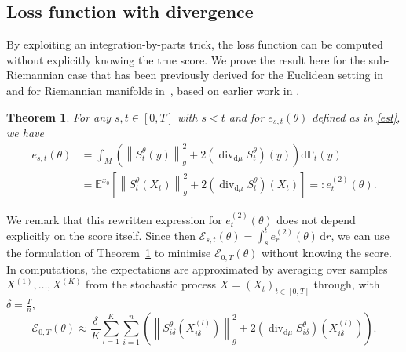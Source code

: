 \documentclass[10pt]{amsart}
\newcounter{dummy} \numberwithin{dummy}{section}
\newtheorem{theorem}[dummy]{Theorem}
\theoremstyle{remark}
\newcommand{\scrE}{\mathscr{E}}
\newcommand{\E}{\mathbb{E}}
\newcommand{\pp}{\mathbb{P}}
\DeclareMathOperator{\dv}{div}
\newcommand{\dd}{\,{\mathrm d}}
\newcommand{\db}{{\mathrm d}}
\numberwithin{equation}{section}
\begin{document}
\subsection{Loss function with divergence}
By exploiting an integration-by-parts trick, the loss function can be computed without explicitly knowing the true score. We prove the result here for the sub-Riemannian case that has been previously derived for the Euclidean setting in~\cite{hyvarinenEstimationNonNormalizedStatistical2005} and for Riemannian manifolds in~\cite{bortoliRiemannianScoreBasedGenerative2022}, based on earlier work in \cite{song2019generative,song2020improved}.

\begin{theorem}\label{thm:IBP}
For any $s,t\in[0,T]$ with $s<t$ and for $e_{s,t}(\theta)$ defined as in \eqref{est}, we have
\begin{equation}
\begin{split}
    e_{s,t}(\theta) & = \int_{M} \left( \left\|S^\theta_{t}(y)\right\|^2_g + 2(\dv_{\db\mu} S_{t}^\theta)(y) \right) \db\pp_{t}(y) \\
    & = \E^{x_0}\left[\left\|S^\theta_{t}(X_t)\right\|^2_g + 2(\dv_{\db\mu} S_{t}^\theta)(X_t)\right]  =: e_t^{(2)}(\theta).
\end{split}
\label{eq:div_loss}
\end{equation}
\end{theorem}
We remark that this rewritten expression for $e_t^{(2)}(\theta)$ does not depend explicitly on the score itself. Since then $\scrE_{s,t}(\theta) = \int_s^t e_r^{(2)}(\theta) \dd r$, we can use the formulation of Theorem~\ref{thm:IBP} to minimise $\scrE_{0,T}(\theta)$ without knowing the score.
In computations, the expectations are approximated by averaging over samples $X^{(1)},\dots,X^{(K)}$ from the stochastic process $X=(X_t)_{t\in [0,T]}$ through, with $\delta = \frac{T}{n}$,
\begin{equation}\label{eq:loss_samples}
\scrE_{0,T}(\theta)
\approx
\frac{\delta}{K}\sum_{l=1}^K \sum_{i=1}^n \left(\left\|S^\theta_{i\delta}(X_{i\delta}^{(l)})\right\|^2_g + 2(\dv_{\db\mu} S_{i\delta}^\theta)(X_{i\delta}^{(l)})\right).
\end{equation}
\end{document}
